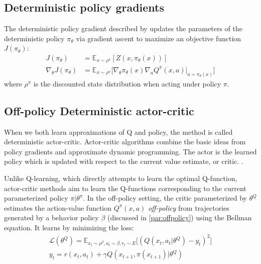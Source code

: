 \subsection{Deterministic policy gradients}
The deterministic policy gradient described by \citet{silver2014b} updates the parameters of the
deterministic policy $\pi_\theta$ via gradient ascent to maximize an objective function $J(\pi_\theta)$:
\begin{align}
    J(\pi_\theta) &=  \mathbb E_{x \sim \rho^\pi} [Z(x,\pi_\theta(x))]\\
    \nabla_\theta J(\pi_\theta) &=  \mathbb E_{x \sim \rho^\pi} 
    \big [\nabla_{\theta} \pi_\theta(x) \nabla_a Q^{\pi}(x,a)|_{a=\pi_\theta(x)}  \big]
\end{align} 
where $\rho^\pi$ is the discounted state distribution when acting under policy $\pi$.


\subsection{Off-policy Deterministic actor-critic} \label{subsec:offpolicy_actor_critic}
When we both learn approximations of Q and policy, the method is called deterministic actor-critic.
Actor-critic algorithms combine the basic ideas from policy gradients and approximate dynamic programming.
The actor is the learned policy which is updated with respect to the current value estimate, or critic.
\cite{Sutton1998}.

Unlike Q-learning, which directly attempts to learn the optimal Q-function, actor-critic methods aim to learn the Q-functions
corresponding to the current parameterized policy $\pi|\theta^\pi$.
In the off-policy setting, the critic parameterized by $\theta^Q$ estimates the 
action-value function $Q^{\pi}(x,a)$ \textit{off-policy}  from
trajectories generated by a behavior policy $\beta$ (discussed in \ref{par:offpolicy}) 
using the Bellman equation.
It learns by minimizing the loss:
\begin{align}
    \mathcal{L}(\theta^Q) = \mathbb E_{x_t\sim \rho^\beta, a_t\sim \beta, r_t\sim E} \Big[ (Q(x_t,a_t| \theta^Q)-y_t)^2          \Big] \nonumber\\ 
    y_t = r(x_t,a_t) + \gamma Q(x_{t+1},\pi(x_{t+1})| \theta^Q) \label{eq:bellman_loss}
\end{align}

